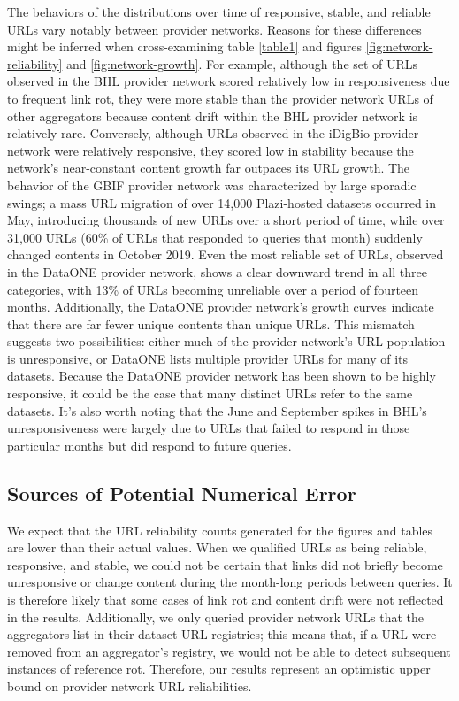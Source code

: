 The behaviors of the distributions over time of responsive, stable, and reliable URLs vary notably between provider networks. Reasons for these differences might be inferred when cross-examining table \ref{table1} and figures \ref{fig:network-reliability} and \ref{fig:network-growth}. For example, although the set of URLs observed in the BHL provider network scored relatively low in responsiveness due to frequent link rot, they were more stable than the provider network URLs of other aggregators because content drift within the BHL provider network is relatively rare. Conversely, although URLs observed in the iDigBio provider network were relatively responsive, they scored low in stability because the network's near-constant content growth far outpaces its URL growth. The behavior of the GBIF provider network was characterized by large sporadic swings; a mass URL migration of over 14,000 Plazi-hosted datasets occurred in May, introducing thousands of new URLs over a short period of time, while over 31,000 URLs (60\% of URLs that responded to queries that month) suddenly changed contents in October 2019. Even the most reliable set of URLs, observed in the DataONE provider network, shows a clear downward trend in all three categories, with 13\% of URLs becoming unreliable over a period of fourteen months. Additionally, the DataONE provider network's growth curves indicate that there are far fewer unique contents than unique URLs. This mismatch suggests two possibilities: either much of the provider network's URL population is unresponsive, or DataONE lists multiple provider URLs for many of its datasets. Because the DataONE provider network has been shown to be highly responsive, it could be the case that many distinct URLs refer to the same datasets. It's also worth noting that the June and September spikes in BHL's unresponsiveness were largely due to URLs that failed to respond in those particular months but did respond to future queries.

\subsection*{Sources of Potential Numerical Error}
We expect that the URL reliability counts generated for the figures and tables are lower than their actual values. When we qualified URLs as being reliable, responsive, and stable, we could not be certain that links did not briefly become unresponsive or change content during the month-long periods between queries. It is therefore likely that some cases of link rot and content drift were not reflected in the results. Additionally, we only queried provider network URLs that the aggregators list in their dataset URL registries; this means that, if a URL were removed from an aggregator's registry, we would not be able to detect subsequent instances of reference rot. Therefore, our results represent an optimistic upper bound on provider network URL reliabilities.

